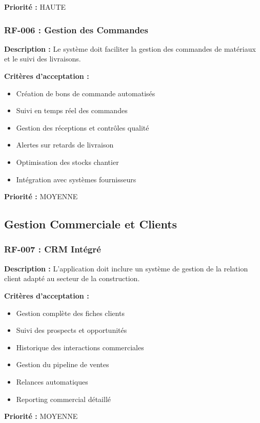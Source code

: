 \textbf{Priorité :} HAUTE

\subsubsection{RF-006 : Gestion des Commandes}

\textbf{Description :} Le système doit faciliter la gestion des commandes de matériaux et le suivi des livraisons.

\textbf{Critères d'acceptation :}
\begin{itemize}
    \item Création de bons de commande automatisés
    \item Suivi en temps réel des commandes
    \item Gestion des réceptions et contrôles qualité
    \item Alertes sur retards de livraison
    \item Optimisation des stocks chantier
    \item Intégration avec systèmes fournisseurs
\end{itemize}

\textbf{Priorité :} MOYENNE

\subsection{Gestion Commerciale et Clients}

\subsubsection{RF-007 : CRM Intégré}

\textbf{Description :} L'application doit inclure un système de gestion de la relation client adapté au secteur de la construction.

\textbf{Critères d'acceptation :}
\begin{itemize}
    \item Gestion complète des fiches clients
    \item Suivi des prospects et opportunités
    \item Historique des interactions commerciales
    \item Gestion du pipeline de ventes
    \item Relances automatiques
    \item Reporting commercial détaillé
\end{itemize}

\textbf{Priorité :} MOYENNE

